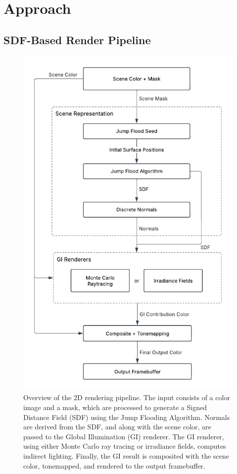 \documentclass[acmtog, nonacm]{acmart}
\begin{document}
\section{Approach}
\subsection{SDF-Based Render Pipeline}

\begin{figure}[ht]
  \centering
  \includegraphics[width=.8\linewidth]{pipeline.pdf}
  \caption{Overview of the 2D rendering pipeline. The input consists of a color image and a mask, which are processed to generate a Signed Distance Field (SDF) using the Jump Flooding Algorithm. Normals are derived from the SDF, and along with the scene color, are passed to the Global Illumination (GI) renderer. The GI renderer, using either Monte Carlo ray tracing or irradiance fields, computes indirect lighting. Finally, the GI result is composited with the scene color, tonemapped, and rendered to the output framebuffer.}
\end{figure}
\end{document}
